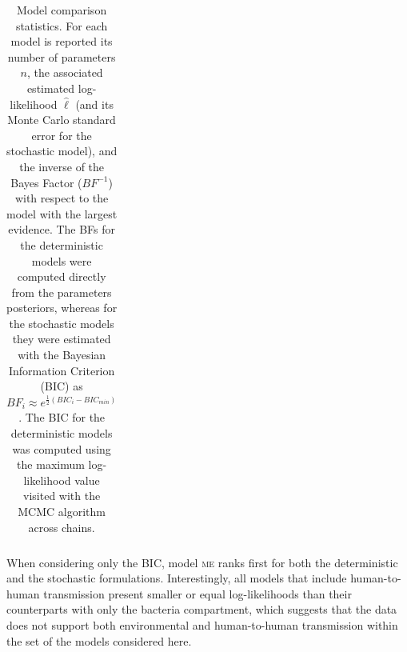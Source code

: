 \begin{table}[h!]
\begin{tabular}{lcccccccc}
   \bottomrule
\end{tabular}
\caption[Model comparison statistics]{Model comparison statistics. For each model is reported its number of parameters $n$, the associated estimated log-likelihood $\hat{\ell}$ (and its Monte Carlo standard error for the stochastic model), and the inverse of the Bayes Factor ($BF^{-1}$) with respect to the model with the largest evidence. The BFs for the deterministic models were computed directly from the parameters posteriors, whereas for the stochastic models they were estimated with the Bayesian Information Criterion (BIC) as $BF_{i} \approx e^{\frac{1}{2} \left( BIC_i - BIC_{min}\right)}$. The BIC for the deterministic models was computed using the maximum log-likelihood value visited with the MCMC algorithm across chains.}\label{tab:stats}
\end{table}
When considering only the BIC, model \textsc{me} ranks first for both the deterministic and the stochastic formulations. Interestingly, all models that include human-to-human transmission present smaller or equal log-likelihoods than their counterparts with only the bacteria compartment, which suggests that the data does not support both environmental and human-to-human transmission within the set of the models considered here.

